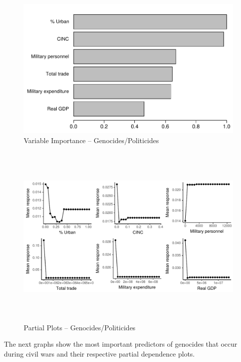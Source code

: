 \documentclass[a4paper,12pt]{article}
\begin{document}
\begin{figure}[H]
    \centering
    \includegraphics{images/drf-gp.pdf}
    \caption{Variable Importance -- Genocides/Politicides}
    \label{fig:my_label}
\end{figure}

\begin{figure}[H]
    \centering
    \includegraphics[width=\textwidth, height=9cm]{images/drfdpp4a.pdf}
    \caption{Partial Plots -- Genocides/Politicides}
    \label{fig:my_label}
\end{figure}

\newpage

The next graphs show the most important predictors of genocides that occur during civil wars and their respective partial dependence plots. 
\end{document}
